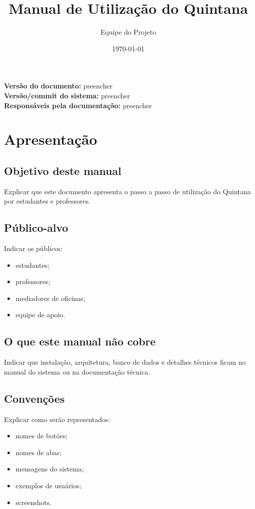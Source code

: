 \documentclass[12pt,a4paper]{article}
\title{Manual de Utilização do Quintana}
\author{Equipe do Projeto}
\date{\today}
\begin{document}
\maketitle

\begin{center}
\textbf{Versão do documento:} preencher \\
\textbf{Versão/commit do sistema:} preencher \\
\textbf{Responsáveis pela documentação:} preencher
\end{center}

\newpage
\tableofcontents
\newpage

\section{Apresentação}

\subsection{Objetivo deste manual}
Explicar que este documento apresenta o passo a passo de utilização do Quintana por estudantes e professores.

\subsection{Público-alvo}
Indicar os públicos:
\begin{itemize}
    \item estudantes;
    \item professores;
    \item mediadores de oficinas;
    \item equipe de apoio.
\end{itemize}

\subsection{O que este manual não cobre}
Indicar que instalação, arquitetura, banco de dados e detalhes técnicos ficam no manual do sistema ou na documentação técnica.

\subsection{Convenções}
Explicar como serão representados:
\begin{itemize}
    \item nomes de botões;
    \item nomes de abas;
    \item mensagens do sistema;
    \item exemplos de usuários;
    \item screenshots.
\end{itemize}
\end{document}
